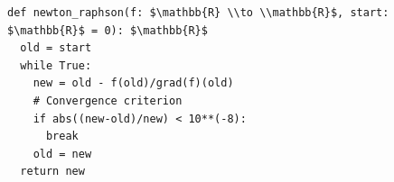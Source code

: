 \documentclass[border=10pt]{standalone}
\begin{document}
\begin{lstlisting}
def newton_raphson(f: $\mathbb{R} \\to \\mathbb{R}$, start: $\mathbb{R}$ = 0): $\mathbb{R}$  
  old = start
  while True:
    new = old - f(old)/grad(f)(old)                 
    # Convergence criterion                              
    if abs((new-old)/new) < 10**(-8):           
      break
    old = new
  return new
\end{lstlisting}
\end{document}
